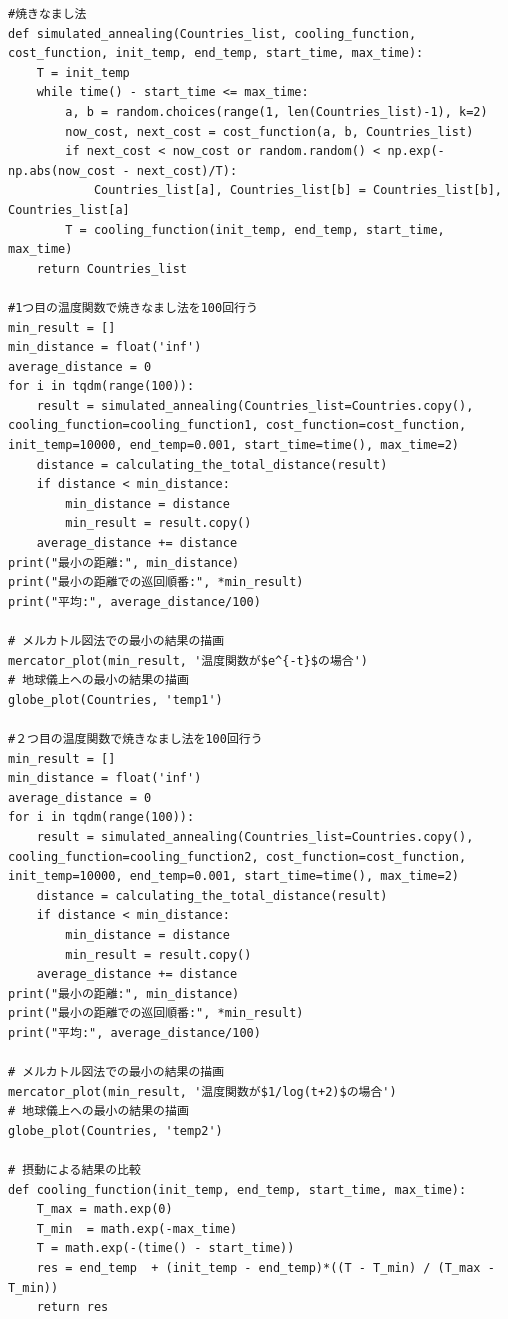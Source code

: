 \documentclass[a4paper,11pt]{ltjsarticle}
\begin{document}
\begin{lstlisting}
#焼きなまし法
def simulated_annealing(Countries_list, cooling_function, cost_function, init_temp, end_temp, start_time, max_time):
    T = init_temp
    while time() - start_time <= max_time:
        a, b = random.choices(range(1, len(Countries_list)-1), k=2)
        now_cost, next_cost = cost_function(a, b, Countries_list)
        if next_cost < now_cost or random.random() < np.exp(-np.abs(now_cost - next_cost)/T):
            Countries_list[a], Countries_list[b] = Countries_list[b], Countries_list[a]
        T = cooling_function(init_temp, end_temp, start_time, max_time)
    return Countries_list

#1つ目の温度関数で焼きなまし法を100回行う
min_result = []
min_distance = float('inf')
average_distance = 0
for i in tqdm(range(100)):
    result = simulated_annealing(Countries_list=Countries.copy(), cooling_function=cooling_function1, cost_function=cost_function, init_temp=10000, end_temp=0.001, start_time=time(), max_time=2)
    distance = calculating_the_total_distance(result)
    if distance < min_distance:
        min_distance = distance
        min_result = result.copy()
    average_distance += distance
print("最小の距離:", min_distance)
print("最小の距離での巡回順番:", *min_result)
print("平均:", average_distance/100)

# メルカトル図法での最小の結果の描画
mercator_plot(min_result, '温度関数が$e^{-t}$の場合')
# 地球儀上への最小の結果の描画
globe_plot(Countries, 'temp1')

#２つ目の温度関数で焼きなまし法を100回行う
min_result = []
min_distance = float('inf')
average_distance = 0
for i in tqdm(range(100)):
    result = simulated_annealing(Countries_list=Countries.copy(), cooling_function=cooling_function2, cost_function=cost_function, init_temp=10000, end_temp=0.001, start_time=time(), max_time=2)
    distance = calculating_the_total_distance(result)
    if distance < min_distance:
        min_distance = distance
        min_result = result.copy()
    average_distance += distance
print("最小の距離:", min_distance)
print("最小の距離での巡回順番:", *min_result)
print("平均:", average_distance/100)

# メルカトル図法での最小の結果の描画
mercator_plot(min_result, '温度関数が$1/log(t+2)$の場合')
# 地球儀上への最小の結果の描画
globe_plot(Countries, 'temp2')

# 摂動による結果の比較
def cooling_function(init_temp, end_temp, start_time, max_time):
    T_max = math.exp(0)
    T_min  = math.exp(-max_time)
    T = math.exp(-(time() - start_time))
    res = end_temp  + (init_temp - end_temp)*((T - T_min) / (T_max - T_min))
    return res


\end{lstlisting}
\end{document}
